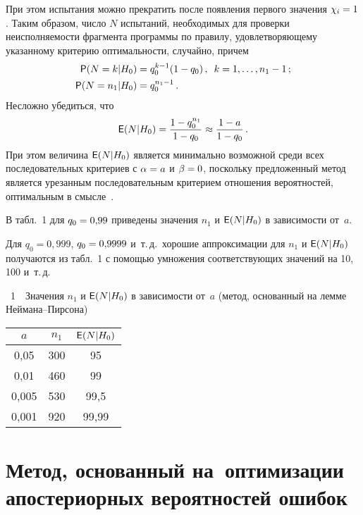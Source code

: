 \begin{multicols}{2}
При этом испытания можно прекратить после появления первого значения
$\chi_i\hm=1$. Таким образом, чис\-ло $N$ испытаний, необходимых для
проверки неисполняемости фрагмента программы по правилу,
удовлетворяющему указанному критерию оптимальности, случайно, причем
\begin{align*}
{\sf P}(N=k|H_0)&=q_0^{k-1}(1-q_0)\,,\enskip  k=1,\ldots,n_1-1\,;\\
 {\sf P}(N=n_1|H_0)&=q_0^{n_1-1}\,.
\end{align*}
Несложно убедиться, что
$$
{\sf E}(N|H_0)=\displaystyle\frac{\displaystyle 1-q_0^{n_1}\mathstrut}{\displaystyle 1-q_0\mathstrut}\approx\displaystyle\frac{\displaystyle 1-a\mathstrut}{\displaystyle 1-q_0\mathstrut}\,.
$$
При этом величина ${\sf E}(N|H_0)$ является минимально возможной
среди всех последовательных критериев с $\alpha\hm=a$ и $\beta\hm=0$,
поскольку предложенный метод является урезанным последовательным
критерием отношения вероятностей, оптимальным в смысле~\cite{Wald1960}.

В табл.~1 для $q_0\hm=0{,}99$ приведены значения $n_1$ и ${\sf E}(N|H_0)$
в зависимости от~$a$.



Для $q_0=0{,}999$, $q_0\hm=0{,}9999$ и~т.\,д.\ хорошие аппроксимации для
$n_1$ и ${\sf E}(N|H_0)$ получаются из табл.~1 с помощью умножения
соответствующих значений на 10, 100 и~т.\,д.

{\small
\begin{center}
\parbox{58mm}{{\normalsize\tablename~1}\ \ \small{Значения $n_1$ и ${\sf E}(N|H_0)$ в зависимости от~$a$
(метод, основанный на лемме Ней\-ма\-на--Пир\-со\-на)}}
\vspace*{6pt}

\tabcolsep=15.5pt
\begin{tabular}{|c|c|c|}
\hline
$a$ &$n_1$ &  ${\sf E}(N|H_0)$\\
\hline
0,05\hphantom{9} & 300 & 95\hphantom{,99}\\
0,01\hphantom{9}& 460& 99\hphantom{,99}\\
0,005 & 530& 99,5\hphantom{9}\\
0,001& 920& 99,99\\
\hline
\end{tabular}
\end{center}
}


\addtocounter{table}{1}



\section{Метод, основанный на~оптимизации апостериорных вероятностей
ошибок}


\end{multicols}
